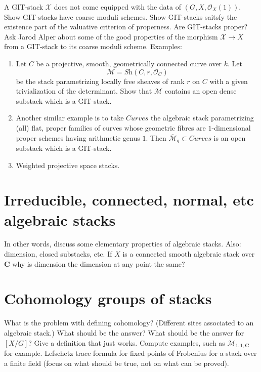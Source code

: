 \noindent
A GIT-stack $\mathcal{X}$ does not come equipped with the data
of $(G, X, \mathcal{O}_X(1))$. Show GIT-stacks have coarse moduli
schemes. Show GIT-stacks saitsfy the existence part of the valuative
criterion of properness. Are GIT-stacks proper?
Ask Jarod Alper about some of the good properties of the
morphism $\mathcal{X} \to X$ from a GIT-stack to its coarse
moduli scheme. Examples:
\begin{enumerate}
\item Let $C$ be a projective, smooth,
geometrically connected curve over $k$. Let
$$
\mathcal{M} = \textit{Sh}(C, r, \mathcal{O}_C)
$$
be the stack parametrizing locally free sheaves of rank $r$ on
$C$ with a given trivialization of the determinant. Show that
$\mathcal{M}$ contains an open dense substack which is a GIT-stack.
\item Another similar example is to take $\textit{Curves}$ the algebraic
stack parametrizing (all) flat, proper families of curves
whose geometric fibres are $1$-dimensional proper schemes
having arithmetic genus $1$. Then
$\overline{\mathcal{M}}_g \subset \textit{Curves}$ is an
open substack which is a GIT-stack.
\item Weighted projective space stacks.
\end{enumerate}


\section{Irreducible, connected, normal, etc algebraic stacks}
\label{section-elementary-properties}

\noindent
In other words, discuss some elementary properties of algebraic stacks.
Also: dimension, closed substacks, etc.
If $X$ is a connected smooth algebraic stack over $\mathbf{C}$
why is dimension the dimension at any point the same?


\section{Cohomology groups of stacks}
\label{section-cohomology}

\noindent
What is the problem with defining cohomology? (Different sites
associated to an algebraic stack.)
What should be the answer? What should be the answer for $[X/G]$?
Give a definition that just works.
Compute examples, such as $\mathcal{M}_{1, 1, \mathbf{C}}$ for example.
Lefschetz trace formula for fixed points of Frobenius
for a stack over a finite field (focus on what should be true, not on
what can be proved).

